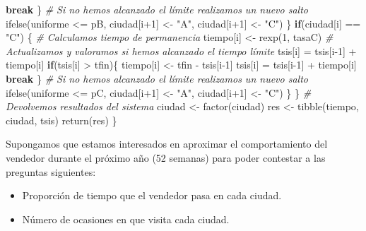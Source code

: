 \documentclass[
]{book}
\newenvironment{Shaded}{\begin{snugshade}}{\end{snugshade}}
\newcommand{\CommentTok}[1]{\textcolor[rgb]{0.56,0.35,0.01}{\textit{#1}}}
\newcommand{\ControlFlowTok}[1]{\textcolor[rgb]{0.13,0.29,0.53}{\textbf{#1}}}
\newcommand{\DecValTok}[1]{\textcolor[rgb]{0.00,0.00,0.81}{#1}}
\newcommand{\FunctionTok}[1]{\textcolor[rgb]{0.00,0.00,0.00}{#1}}
\newcommand{\NormalTok}[1]{#1}
\newcommand{\OtherTok}[1]{\textcolor[rgb]{0.56,0.35,0.01}{#1}}
\newcommand{\SpecialCharTok}[1]{\textcolor[rgb]{0.00,0.00,0.00}{#1}}
\newcommand{\StringTok}[1]{\textcolor[rgb]{0.31,0.60,0.02}{#1}}
\providecommand{\tightlist}{%
  \setlength{\itemsep}{0pt}\setlength{\parskip}{0pt}}
\theoremstyle{definition}
\theoremstyle{definition}
\theoremstyle{definition}
\theoremstyle{definition}
\theoremstyle{remark}
\begin{document}
\begin{Shaded}
\begin{Highlighting}[]
            \ControlFlowTok{break}
\NormalTok{          \}}
        \CommentTok{\# Si no hemos alcanzado el límite realizamos un nuevo salto}
        \FunctionTok{ifelse}\NormalTok{(uniforme }\SpecialCharTok{\textless{}=}\NormalTok{ pB, ciudad[i}\SpecialCharTok{+}\DecValTok{1}\NormalTok{] }\OtherTok{\textless{}{-}} \StringTok{"A"}\NormalTok{, ciudad[i}\SpecialCharTok{+}\DecValTok{1}\NormalTok{] }\OtherTok{\textless{}{-}} \StringTok{"C"}\NormalTok{)}
\NormalTok{      \}  }
    \ControlFlowTok{if}\NormalTok{(ciudad[i] }\SpecialCharTok{==} \StringTok{"C"}\NormalTok{)}
\NormalTok{      \{}
        \CommentTok{\# Calculamos tiempo de permanencia}
\NormalTok{        tiempo[i] }\OtherTok{\textless{}{-}} \FunctionTok{rexp}\NormalTok{(}\DecValTok{1}\NormalTok{, tasaC)}
        \CommentTok{\# Actualizamos y valoramos si hemos alcanzado el tiempo límite}
\NormalTok{        tsis[i] }\OtherTok{=}\NormalTok{ tsis[i}\DecValTok{{-}1}\NormalTok{] }\SpecialCharTok{+}\NormalTok{ tiempo[i]}
        \ControlFlowTok{if}\NormalTok{(tsis[i] }\SpecialCharTok{\textgreater{}}\NormalTok{ tfin)\{}
\NormalTok{            tiempo[i] }\OtherTok{\textless{}{-}}\NormalTok{ tfin }\SpecialCharTok{{-}}\NormalTok{ tsis[i}\DecValTok{{-}1}\NormalTok{] }
\NormalTok{            tsis[i] }\OtherTok{=}\NormalTok{ tsis[i}\DecValTok{{-}1}\NormalTok{] }\SpecialCharTok{+}\NormalTok{ tiempo[i]}
            \ControlFlowTok{break}
\NormalTok{          \}}
        \CommentTok{\# Si no hemos alcanzado el límite realizamos un nuevo salto}
        \FunctionTok{ifelse}\NormalTok{(uniforme }\SpecialCharTok{\textless{}=}\NormalTok{ pC, ciudad[i}\SpecialCharTok{+}\DecValTok{1}\NormalTok{] }\OtherTok{\textless{}{-}} \StringTok{"A"}\NormalTok{, ciudad[i}\SpecialCharTok{+}\DecValTok{1}\NormalTok{] }\OtherTok{\textless{}{-}} \StringTok{"C"}\NormalTok{)}
\NormalTok{      \}}
\NormalTok{  \}}
  \CommentTok{\# Devolvemos resultados del sistema }
\NormalTok{  ciudad }\OtherTok{\textless{}{-}} \FunctionTok{factor}\NormalTok{(ciudad)}
\NormalTok{  res }\OtherTok{\textless{}{-}} \FunctionTok{tibble}\NormalTok{(tiempo, ciudad, tsis)}
  \FunctionTok{return}\NormalTok{(res)}
\NormalTok{\}}
\end{Highlighting}
\end{Shaded}

Supongamos que estamos interesados en aproximar el comportamiento del vendedor durante el próximo año (52 semanas) para poder contestar a las preguntas siguientes:

\begin{itemize}
\tightlist
\item
  Proporción de tiempo que el vendedor pasa en cada ciudad.
\item
  Número de ocasiones en que visita cada ciudad.
\end{itemize}
\end{document}
